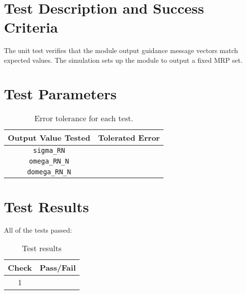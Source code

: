 
\section{Test Description and Success Criteria}
The unit test verifies that the module output guidance message vectors match expected values.  The simulation sets up the module to output a fixed MRP set.


\section{Test Parameters}

\begin{table}[htbp]
	\caption{Error tolerance for each test.}
	\label{tab:errortol}
	\centering \fontsize{10}{10}\selectfont
	\begin{tabular}{ c | c } %
		\hline\hline
		\textbf{Output Value Tested}  & \textbf{Tolerated Error}  \\ 
		\hline
		{\tt sigma\_RN}        & 	   \\ 
		{\tt omega\_RN\_N}        & 	   \\ 
		{\tt domega\_RN\_N}        & 	   \\ 
		\hline\hline
	\end{tabular}
\end{table}




\section{Test Results}
All of the tests passed:
\begin{table}[H]
	\caption{Test results}
	\label{tab:results}
	\centering \fontsize{10}{10}\selectfont
	\begin{tabular}{c | c  } %
		\hline\hline
		\textbf{Check} 						  		&\textbf{Pass/Fail} \\ 
		\hline
	   1	   			&  \\ 
	   \hline\hline
	\end{tabular}
\end{table}



